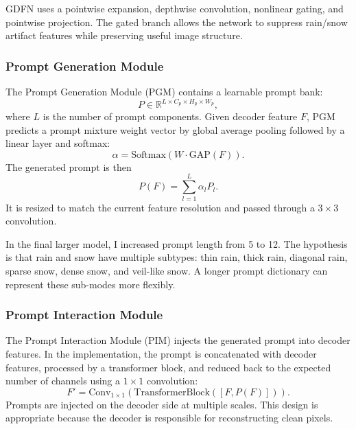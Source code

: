\documentclass[10pt,conference]{article}
\begin{document}
GDFN uses a pointwise expansion, depthwise convolution, nonlinear gating, and pointwise projection. The gated branch allows the network to suppress rain/snow artifact features while preserving useful image structure.

\subsubsection{Prompt Generation Module}

The Prompt Generation Module (PGM) contains a learnable prompt bank:
\begin{equation}
    P \in \mathbb{R}^{L \times C_p \times H_p \times W_p},
\end{equation}
where $L$ is the number of prompt components. Given decoder feature $F$, PGM predicts a prompt mixture weight vector by global average pooling followed by a linear layer and softmax:
\begin{equation}
    \alpha = \mathrm{Softmax}(W \cdot \mathrm{GAP}(F)).
\end{equation}
The generated prompt is then
\begin{equation}
    P(F) = \sum_{l=1}^{L} \alpha_l P_l.
\end{equation}
It is resized to match the current feature resolution and passed through a $3\times3$ convolution.

In the final larger model, I increased prompt length from 5 to 12. The hypothesis is that rain and snow have multiple subtypes: thin rain, thick rain, diagonal rain, sparse snow, dense snow, and veil-like snow. A longer prompt dictionary can represent these sub-modes more flexibly.

\subsubsection{Prompt Interaction Module}

The Prompt Interaction Module (PIM) injects the generated prompt into decoder features. In the implementation, the prompt is concatenated with decoder features, processed by a transformer block, and reduced back to the expected number of channels using a $1\times1$ convolution:
\begin{equation}
    F' = \mathrm{Conv}_{1\times1}(\mathrm{TransformerBlock}([F, P(F)])).
\end{equation}
Prompts are injected on the decoder side at multiple scales. This design is appropriate because the decoder is responsible for reconstructing clean pixels.
\end{document}
